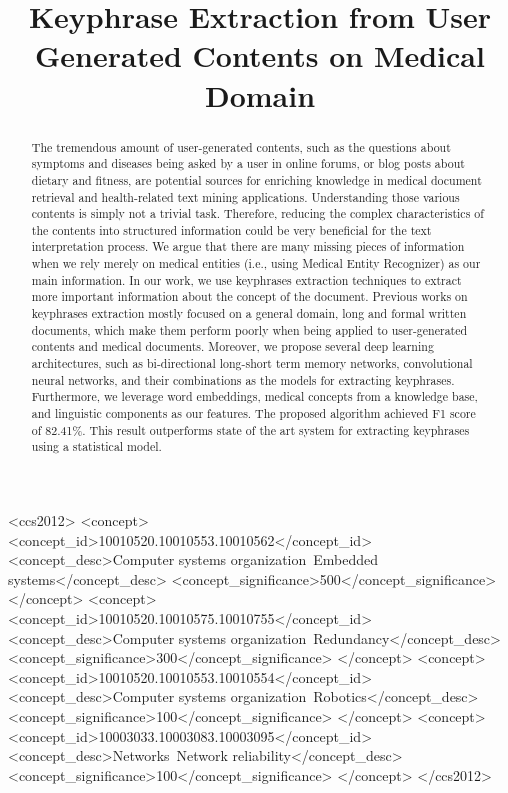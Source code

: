 \documentclass[sigconf]{acmart}
\begin{document}
\title{Keyphrase Extraction from User Generated Contents on Medical Domain}
\iffalse
\titlenote{Produces the permission block, and
  copyright information}
\subtitle{Extended Abstract}
\subtitlenote{The full version of the author's guide is available as
  \texttt{acmart.pdf} document}
\fi



\begin{abstract}
The tremendous amount of user-generated contents, such as the questions about symptoms and diseases being asked by a user in online forums, or blog posts about dietary and fitness, are potential sources for enriching knowledge in medical document retrieval and health-related text mining applications. Understanding those various contents is simply not a trivial task. Therefore, reducing the complex characteristics of the contents into structured information could be very beneficial for the text interpretation process. We argue that there are many missing pieces of information when we rely merely on medical entities (i.e., using Medical Entity Recognizer) as our main information. In our work, we use keyphrases extraction techniques to extract more important information about the concept of the document. Previous works on keyphrases extraction mostly focused on a general domain, long and formal written documents, which make them perform poorly when being applied to user-generated contents and medical documents. Moreover, we propose several deep learning architectures, such as bi-directional long-short term memory networks, convolutional neural networks, and their combinations as the models for extracting keyphrases. Furthermore, we leverage word embeddings, medical concepts from a knowledge base, and linguistic components as our features. The proposed algorithm achieved F1 score of 82.41\%. This result outperforms state of the art system for extracting keyphrases using a statistical model.
\end{abstract}

%
%
\iffalse
\begin{CCSXML}
<ccs2012>
 <concept>
  <concept_id>10010520.10010553.10010562</concept_id>
  <concept_desc>Computer systems organization~Embedded systems</concept_desc>
  <concept_significance>500</concept_significance>
 </concept>
 <concept>
  <concept_id>10010520.10010575.10010755</concept_id>
  <concept_desc>Computer systems organization~Redundancy</concept_desc>
  <concept_significance>300</concept_significance>
 </concept>
 <concept>
  <concept_id>10010520.10010553.10010554</concept_id>
  <concept_desc>Computer systems organization~Robotics</concept_desc>
  <concept_significance>100</concept_significance>
 </concept>
 <concept>
  <concept_id>10003033.10003083.10003095</concept_id>
  <concept_desc>Networks~Network reliability</concept_desc>
  <concept_significance>100</concept_significance>
 </concept>
</ccs2012>  
\end{CCSXML}
\end{document}
